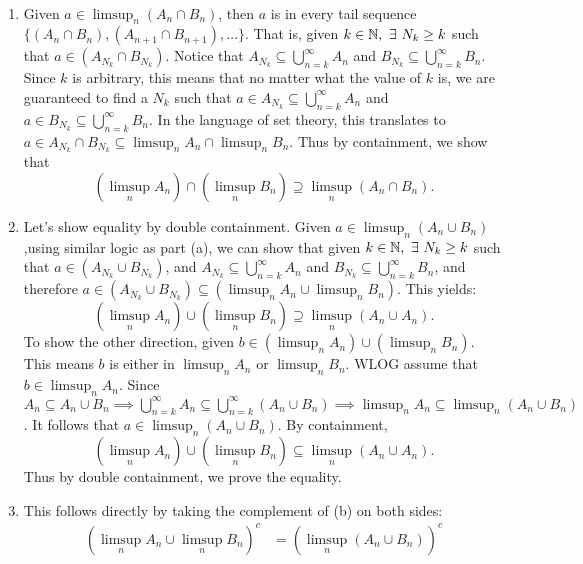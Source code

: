 \documentclass[12pt]{article}
\begin{document}
\begin{problem}[2]
~\begin{enumerate}[label=\alph*)]
	\item Given $ a \in \limsup_{  n} (A_n \cap B_n)$, then $ a$ is in every tail sequence $ \{(A_n \cap B_n), (A_{n+1} \cap B_{n+1}),\ldots\} $. That is, given $ k \in \mathbb{N}, \ \exists \  N_k \geq k$ such that $ a \in (A_{N_{k}} \cap B_{N_{k}})$. Notice that $ A_{N_{k}} \subseteq \bigcup_{ n =k}^{\infty}A_n $ and $ B_{N_{k}} \subseteq \bigcup_{ n =k}^{\infty} B_n $. Since $ k$ is arbitrary, this means that no matter what the value of $ k$ is, we are guaranteed to find a $ N_{k}$ such that $ a \in A_{N_{k}} \subseteq \bigcup_{ n =k}^{\infty}A_n $ and $ a \in B_{N_{k}} \subseteq \bigcup_{ n =k}^{\infty} B_n $. In the language of set theory, this translates to $ a \in A_{N_{k}} \cap B_{N_{k}} \subseteq \limsup_{  n} A_n \cap \limsup_{  n} B_n $. Thus by containment, we show that
		\[
			(\limsup_{  n} A_n) \cap (\limsup_{  n} B_n) \supseteq \limsup_{  n} (A_n \cap B_n)
		.\] 
	\item Let's show equality by double containment. Given $ a \in \limsup_{  n} (A_n \cup B_n)$,using similar logic as part (a), we can show that given $ k \in \mathbb{N}, \ \exists \ N_k \geq k$ such that $ a \in (A_{N_{k}} \cup B_{N_{k}})$, and $ A_{N_{k}} \subseteq \bigcup_{ n =k}^{\infty} A_n$ and $ B_{N_{k}} \subseteq \bigcup_{ n =k}^{\infty} B_n $, and therefore $ a \in (A_{N_{k}} \cup B_{N_{k}}) \subseteq (\limsup_{  n} A_n \cup \limsup_{  n} B_n) $. This yields:
		\[
			(\limsup_{  n} A_n) \cup (\limsup_{  n} B_n) \supseteq \limsup_{  n} (A_n \cup A_n)
		.\]
		To show the other direction, given $ b \in (\limsup_{  n} A_n) \cup (\limsup_{  n} B_n) $. This means $ b$ is either in  $ \limsup_{  n} A_n$ or $ \limsup_{  n} B_n$. WLOG assume that $ b \in \limsup_{  n} A_n$. Since $ A_n \subseteq A_n \cup B_n \implies \bigcup_{ n =k}^{\infty} A_n \subseteq \bigcup_{ n =k}^{\infty} (A_n \cup B_n) \implies \limsup_{  n} A_n \subseteq \limsup_{  n} (A_n \cup B_n)$. It follows that $ a \in \limsup_{  n} (A_n \cup B_n)$. By containment,
		\[
			(\limsup_{  n} A_n) \cup (\limsup_{  n} B_n) \subseteq \limsup_{  n} (A_n \cup A_n)
		.\]
		Thus by double containment, we prove the equality.
\item This follows directly by taking the complement of (b) on both sides:
	\begin{align*}
		\left( \limsup_{  n} A_n \cup \limsup_{  n} B_n \right)^{c} &= \left( \limsup_{  n} (A_n \cup B_n) \right)^{c}  \\ 

\end{align*}
\end{enumerate}
\end{problem}
\end{document}
